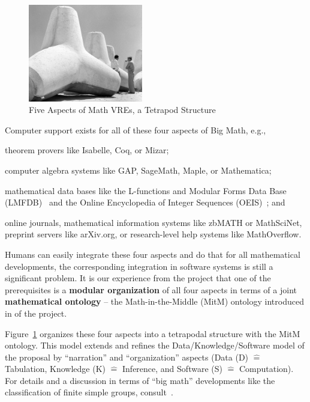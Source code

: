 \begin{figure}[ht]\centering
\includegraphics[width=5cm]{tetrapod}\qquad

\caption{Five Aspects of Math VREs, a Tetrapod Structure}\label{fig:tetrapod}
\end{figure}
Computer support exists for all of these four aspects of Big Math, e.g.,
\begin{compactenum}[\em i\rm)]
\item theorem provers like Isabelle, Coq, or Mizar;
\item computer algebra systems like GAP, SageMath, Maple, or Mathematica;
\item mathematical data bases like the L-functions and Modular Forms Data 
Base (LMFDB)~\cite{Cremona:LMFDB16,lmfdb:on} and the Online Encyclopedia of
Integer Sequences (OEIS)~\cite{Sloane:OEIS}; and
\item online journals, mathematical information systems like zbMATH or MathSciNet,
  preprint servers like arXiv.org, or research-level help systems like MathOverflow.
\end{compactenum}
Humans can easily integrate these four aspects and do that for all mathematical developments, the corresponding integration in software systems is still a significant problem. It is our experience from the \pn project that one of the prerequisites is a \textbf{modular organization} of all four aspects in terms of a joint \textbf{mathematical ontology} -- the Math-in-the-Middle (MitM) ontology introduced in  of the \pn project.

\def\hateq{\ensuremath{\widehat=}\xspace} Figure~\ref{fig:tetrapod} organizes these four aspects into a tetrapodal structure with the MitM ontology.  This model extends and refines the Data/Knowledge/Software model of the proposal by ``narration'' and ``organization'' aspects (Data (D) \hateq Tabulation, Knowledge (K) \hateq Inference, and Software (S) \hateq Computation). For details and a discussion in terms of ``big math'' developments like the classification of finite simple groups, consult~\cite{CarFarKohRab:bmobb19}.

